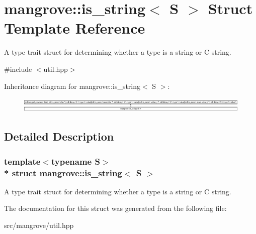 \hypertarget{structmangrove_1_1is__string}{}\section{mangrove\+:\+:is\+\_\+string$<$ S $>$ Struct Template Reference}
\label{structmangrove_1_1is__string}


A type trait struct for determining whether a type is a string or C string.  




{\ttfamily \#include $<$util.\+hpp$>$}

Inheritance diagram for mangrove\+:\+:is\+\_\+string$<$ S $>$\+:\begin{figure}[H]
\begin{center}
\leavevmode
\includegraphics[height=0.748163cm]{structmangrove_1_1is__string}
\end{center}
\end{figure}


\subsection{Detailed Description}
\subsubsection*{template$<$typename S$>$\\*
struct mangrove\+::is\+\_\+string$<$ S $>$}

A type trait struct for determining whether a type is a string or C string. 

The documentation for this struct was generated from the following file\+:\begin{DoxyCompactItemize}
\item 
src/mangrove/util.\+hpp\end{DoxyCompactItemize}
